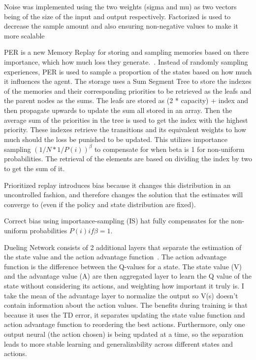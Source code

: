 \documentclass{article}
\begin{document}
Noise was implemented using the two weights (sigma and mu) as two vectors being of the size of the input and output respectively.
Factorized is used to decrease the sample amount and also ensuring non-negative values to make it more scalable


PER is a new Memory Replay for storing and sampling memories based on there importance, which how much loss they generate.~\cite{schaul_prioritized_2016}.
Instead of randomly sampling experiences, PER is used to sample a proportion of the states based on how much it influences the agent.
The storage uses a Sum Segment Tree to store the indexes of the memories and their corresponding priorities to be retrieved as the leafs and the parent nodes as the sums.
The leafs are stored as (2 * capacity) + index and then propagate upwards to update the sum all stored in an array.
Then the average sum of the priorities in the tree is used to get the index with the highest priority.
These indexes retrieve the transitions and its equivalent weights to how much should the loss be punished to be updated.
This utilizes importance sampling \((1/N * 1/P(i))^{\beta}\) to compensate for when beta is 1 for non-uniform probabilities.
The retrieval of the elements are based on dividing the index by two to get the sum of it.

Prioritized replay introduces bias because it changes this
distribution in an uncontrolled fashion, and therefore changes the solution that the estimates will
converge to (even if the policy and state distribution are fixed). 

Correct bias using importance-sampling (IS) 
hat fully compensates for the non-uniform probabilities \(P(i) if \beta = 1\). 

Dueling Network consists of 2 additional layers that separate the estimation of the state value and the action advantage function~\cite{wang_dueling_2016}.
The action advantage function is the difference between the Q-values for a state.
The state value (V) and the advantage value (A) are then aggregated layer to learn the Q value of the state without considering its actions, and weighting how important it truly is.
I take the mean of the advantage layer to normalize the output so V(s) doesn't contain information about the action values.
The benefits during training is that because it uses the TD error, it separates updating the state value function and action advantage function to reordering the best actions.
Furthermore, only one output neural (the action chosen) is being updated at a time, so the separation leads to more stable learning and generalizability across different states and actions.
\end{document}
